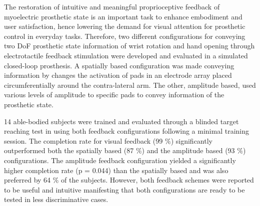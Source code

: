 The restoration of intuitive and meaningful proprioceptive feedback of myoelectric prosthetic state is an important task to enhance embodiment and user satisfaction, hence lowering the demand for visual attention for prosthetic control in everyday tasks. Therefore, two different configurations for conveying two DoF prosthetic state information of wrist rotation and hand opening through electrotactile feedback stimulation were developed and evaluated in a simulated closed-loop prosthesis. A spatially based configuration was made conveying information by changes the activation of pads in an electrode array placed circumferentially around the contra-lateral arm. The other, amplitude based, used various levels of amplitude to specific pads to convey information of the prosthetic state. 

14 able-bodied subjects were trained and evaluated through a blinded target reaching test in using both feedback configurations following a minimal training session. The completion rate for visual feedback (99 $\%$) significantly outperformed both the spatially based (87 $\%$) and the amplitude based (93 $\%$) configurations. The amplitude feedback configuration yielded a significantly higher completion rate (p = 0.044) than the spatially based and was also preferred by 64 $\%$ of the subjects. However, both feedback schemes were reported to be useful and intuitive manifesting that both configurations are ready to be tested in less discriminative cases.    
